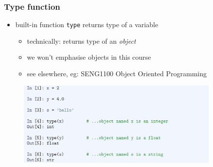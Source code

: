 \documentclass[14pt]{beamer}
\newcommand\red[1]{{\color{red} #1}}
\begin{document}
\begin{frame}[fragile]

\frametitle{Type function}

\begin{itemize}
	\item built-in function \texttt{type} returns type of a variable
	\begin{itemize}
		\item technically: returns type of an \red{\emph{object}}
		\item we won't emphasise objects in this course
		\item see elsewhere, eg: SENG1100 Object Oriented Programming
	\end{itemize}
\end{itemize}
\vspace*{-3mm}
\begin{figure}[ht]
	\centering
	\includegraphics[width=0.9\textwidth]{figures/LLp43a}
\end{figure}

\end{frame}

\end{document}
